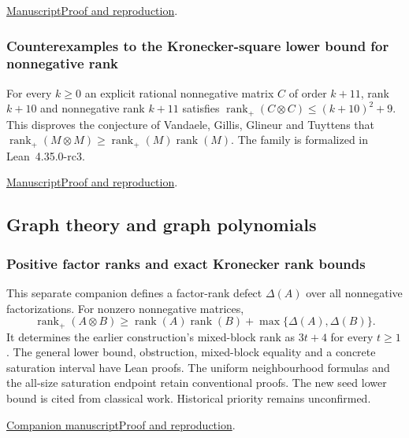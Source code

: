 \documentclass[11pt,a4paper]{article}
\begin{document}
\href{https://github.com/dvgyl/math-and-theory/blob/main/papers/mathematics/matrix-pencil-completion/manuscript.pdf}{Manuscript}\quad\href{https://github.com/dvgyl/math-and-theory/blob/main/papers/mathematics/matrix-pencil-completion/README.md}{Proof and reproduction}.

\subsubsection{Counterexamples to the Kronecker-square lower bound for nonnegative rank}

For every $k\ge0$ an explicit rational nonnegative matrix $C$ of order $k+11$, rank $k+10$ and nonnegative rank $k+11$ satisfies $\operatorname{rank}_+(C\otimes C)\le(k+10)^2+9$. This disproves the conjecture of Vandaele, Gillis, Glineur and Tuyttens that $\operatorname{rank}_+(M\otimes M)\ge\operatorname{rank}_+(M)\operatorname{rank}(M)$. The family is formalized in Lean~4.35.0-rc3.

\noindent\href{https://github.com/dvgyl/math-and-theory/blob/main/papers/mathematics/nonnegative-rank-kronecker/manuscript.pdf}{Manuscript}\quad\href{https://github.com/dvgyl/math-and-theory/blob/main/papers/mathematics/nonnegative-rank-kronecker/README.md}{Proof and reproduction}.

\subsection{Graph theory and graph polynomials}

\subsubsection{Positive factor ranks and exact Kronecker rank bounds}

This separate companion defines a factor-rank defect $\Delta(A)$ over all nonnegative factorizations. For nonzero nonnegative matrices,
\[
\operatorname{rank}_{+}(A\otimes B)\ge \operatorname{rank}(A)\operatorname{rank}(B)+\max\{\Delta(A),\Delta(B)\}.
\]
It determines the earlier construction's mixed-block rank as $3t+4$ for every $t\ge1$. The general lower bound, obstruction, mixed-block equality and a concrete saturation interval have Lean proofs. The uniform neighbourhood formulas and the all-size saturation endpoint retain conventional proofs. The new seed lower bound is cited from classical work. Historical priority remains unconfirmed.

\noindent\href{https://github.com/dvgyl/math-and-theory/blob/main/papers/mathematics/nonnegative-rank-positive-core/manuscript.pdf}{Companion manuscript}\quad\href{https://github.com/dvgyl/math-and-theory/blob/main/papers/mathematics/nonnegative-rank-positive-core/README.md}{Proof and reproduction}.
\end{document}
